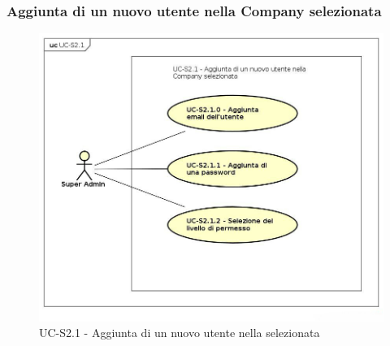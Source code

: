 \subsubsection{Aggiunta di un nuovo utente nella Company selezionata}
    \begin{figure}[H]
      \begin{center}
        \includegraphics[width=12cm]{res/img/UCSuperadmin/UC-S2.1.png}
      \caption{UC-S2.1 - Aggiunta di un nuovo utente nella  selezionata}
      \end{center} 
    \end{figure}    
    
